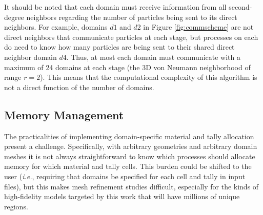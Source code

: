 \documentclass[12pt,twoside]{mitthesis-exec}
\begin{document}
\begin{figure*}[t]

  \caption[Scheme for inter-domain particle communication
  algorithm]{\emph{Left}: Scheme of four square domains, where processes on
  domains $d1$, $d2$, and $d3$ have a total of nine particles to send to
  processes on domain $d4$. \emph{Right}: Particle communication scheme from the
  perspective of process $p1$ on domain $d2$, when deciding how to send
  particles 5 and 6 to domain $d4$. The total number of particles being sent to
  domain $d4$ are conceptualized as existing in a fictitious ordered array,
  where slices are `owned' by different processes. The left is the particle
  array from the perspective of sending processes; the right is same array from
  the perspective of receiving processes. By comparing the starting and ending
  indices of the slices between the sending and receiving processes, each
  process can decide where to send particles in a distributed fashion. In this
  example, this process sends one particle to process $p2$ and one particle to
  process $p3$. \label{fig:commscheme}}
\end{figure*}

It should be noted that each domain must receive information from all
second-degree neighbors regarding the number of particles being sent to its
direct neighbors. For example, domains $d1$ and $d2$ in Figure
\ref{fig:commscheme} are not direct neighbors that communicate particles at each
stage, but processes on each do need to know how many particles are being sent
to their shared direct neighbor domain $d4$. Thus, at most each domain must
communicate with a maximum of 24 domains at each stage (the 3D von Neumann
neighborhood of range $r = 2$). This means that the computational complexity of
this algorithm is not a direct function of the number of domains.

\subsection*{Memory Management}

The practicalities of implementing domain-specific material and tally allocation
present a challenge. Specifically, with arbitrary geometries and arbitrary
domain meshes it is not always straightforward to know which processes should
allocate memory for which material and tally cells. This burden could be shifted
to the user (\emph{i.e.}, requiring that domains be specified for each cell and
tally in input files), but this makes mesh refinement studies difficult,
especially for the kinds of high-fidelity models targeted by this work that will
have millions of unique regions.
\end{document}
